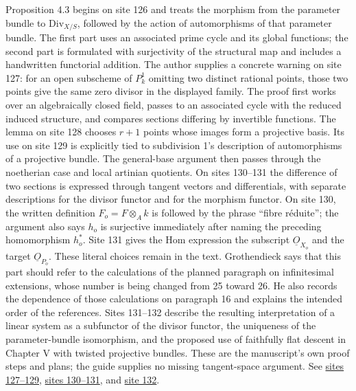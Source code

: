 \documentclass[10pt,a4paper]{article}
\begin{document}
Proposition 4.3 begins on site 126 and treats the morphism from the parameter bundle to \(\mathrm{Div}_{X/S}\), followed by the action of automorphisms of that parameter bundle. The first part uses an associated prime cycle and its global functions; the second part is formulated with surjectivity of the structural map and includes a handwritten functorial addition. The author supplies a concrete warning on site 127: for an open subscheme of \(P^1_k\) omitting two distinct rational points, those two points give the same zero divisor in the displayed family. The proof first works over an algebraically closed field, passes to an associated cycle with the reduced induced structure, and compares sections differing by invertible functions. The lemma on site 128 chooses \(r+1\) points whose images form a projective basis. Its use on site 129 is explicitly tied to subdivision 1's description of automorphisms of a projective bundle. The general-base argument then passes through the noetherian case and local artinian quotients. On sites 130--131 the difference of two sections is expressed through tangent vectors and differentials, with separate descriptions for the divisor functor and for the morphism functor. On site 130, the written definition \(F_o=F\otimes_A k\) is followed by the phrase ``fibre réduite''; the argument also says \(h_o\) is surjective immediately after naming the preceding homomorphism \(h_o^*\). Site 131 gives the Hom expression the subscript \(\underline O_{X_o}\) and the target \(\underline O_{P_o}\). These literal choices remain in the text. Grothendieck says that this part should refer to the calculations of the planned paragraph on infinitesimal extensions, whose number is being changed from 25 toward 26. He also records the dependence of those calculations on paragraph 16 and explains the intended order of the references. Sites 131--132 describe the resulting interpretation of a linear system as a subfunctor of the divisor functor, the uniqueness of the parameter-bundle isomorphism, and the proposed use of faithfully flat descent in Chapter V with twisted projective bundles. These are the manuscript's own proof steps and plans; the guide supplies no missing tangent-space argument. See \href{https://grothendieck.umontpellier.fr/web/viewer.html?file=../25.pdf#page=128}{sites 127--129}, \href{https://grothendieck.umontpellier.fr/web/viewer.html?file=../25.pdf#page=131}{sites 130--131}, and \href{https://grothendieck.umontpellier.fr/web/viewer.html?file=../25.pdf#page=133}{site 132}.
\end{document}
